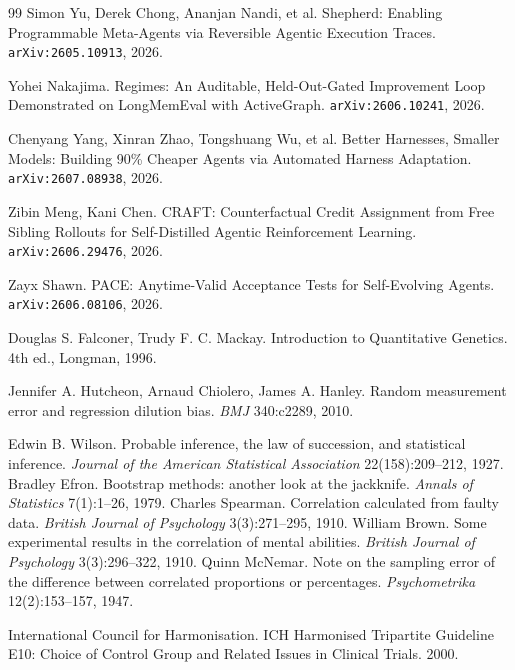 \begin{thebibliography}{99}
 Simon Yu, Derek Chong, Ananjan Nandi, et al. Shepherd:
  Enabling Programmable Meta-Agents via Reversible Agentic Execution
  Traces. \texttt{arXiv:2605.10913}, 2026.

 Yohei Nakajima. Regimes: An Auditable, Held-Out-Gated
  Improvement Loop Demonstrated on LongMemEval with ActiveGraph.
  \texttt{arXiv:2606.10241}, 2026.

 Chenyang Yang, Xinran Zhao, Tongshuang Wu, et
  al. Better Harnesses, Smaller Models: Building 90\% Cheaper Agents via
  Automated Harness Adaptation. \texttt{arXiv:2607.08938}, 2026.

 Zibin Meng, Kani Chen. CRAFT: Counterfactual Credit
  Assignment from Free Sibling Rollouts for Self-Distilled Agentic
  Reinforcement Learning. \texttt{arXiv:2606.29476}, 2026.

 Zayx Shawn. PACE: Anytime-Valid Acceptance Tests for
  Self-Evolving Agents. \texttt{arXiv:2606.08106}, 2026.

 Douglas S. Falconer, Trudy F. C. Mackay.
  Introduction to Quantitative Genetics. 4th ed., Longman, 1996.

 Jennifer A. Hutcheon, Arnaud Chiolero, James
  A. Hanley. Random measurement error and regression dilution bias.
  \emph{BMJ} 340:c2289, 2010.

 Edwin B. Wilson. Probable inference, the law of
  succession, and statistical inference. \emph{Journal of the American
  Statistical Association} 22(158):209--212, 1927.
 Bradley Efron. Bootstrap methods: another look at the
  jackknife. \emph{Annals of Statistics} 7(1):1--26, 1979.
 Charles Spearman. Correlation calculated from
  faulty data. \emph{British Journal of Psychology} 3(3):271--295, 1910.
 William Brown. Some experimental results in the
  correlation of mental abilities. \emph{British Journal of Psychology}
  3(3):296--322, 1910.
 Quinn McNemar. Note on the sampling error of the
  difference between correlated proportions or percentages.
  \emph{Psychometrika} 12(2):153--157, 1947.

 International Council for Harmonisation. ICH
  Harmonised Tripartite Guideline E10: Choice of Control Group and
  Related Issues in Clinical Trials. 2000.

\end{thebibliography}
